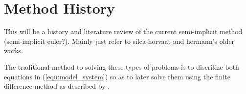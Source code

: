 \section{Method History}

This will be a history and literature review of the current semi-implicit method (semi-implicit euler?).
Mainly just refer to silca-horvaat and hermann's older works.

The traditional method to solving these types of problems is to discritize both equations in (\ref{equ:model_system}) so as to later solve them using the finite difference method as described by \cite{sirca2012computational}.
